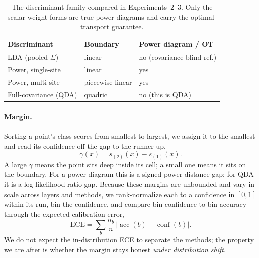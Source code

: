 \begin{table}[t]
  \centering
  \small
  \caption{The discriminant family compared in Experiments~2--3. Only the scalar-weight forms
  are true power diagrams and carry the optimal-transport guarantee.}
  \label{tab:family}
  \begin{tabular}{@{}lll@{}}
    \toprule
    Discriminant & Boundary & Power diagram / OT \\
    \midrule
    LDA (pooled $\Sigma$)  & linear            & no (covariance-blind ref.) \\
    Power, single-site     & linear            & yes \\
    Power, multi-site      & piecewise-linear  & yes \\
    Full-covariance (QDA)  & quadric           & no (this is QDA) \\
    \bottomrule
  \end{tabular}
\end{table}

\paragraph{Margin.}
Sorting a point's class scores from smallest to largest, we assign it to the smallest and read
its confidence off the gap to the runner-up,
\begin{equation}
  \gamma(x) = s_{(2)}(x) - s_{(1)}(x).
  \label{eq:margin}
\end{equation}
A large $\gamma$ means the point sits deep inside its cell; a small one means it sits on the
boundary. For a power diagram this is a signed power-distance gap; for QDA it is a
log-likelihood-ratio gap. Because these margins are unbounded and vary in scale across layers and
methods, we rank-normalize each to a confidence in $[0,1]$ within its run, bin the confidence,
and compare bin confidence to bin accuracy through the expected calibration error,
\begin{equation}
  \mathrm{ECE} = \sum_b \frac{n_b}{n}\,\big|\operatorname{acc}(b) - \operatorname{conf}(b)\big|.
  \label{eq:ece}
\end{equation}
We do not expect the in-distribution ECE to separate the methods; the property we are after is
whether the margin stays honest \emph{under distribution shift}.

